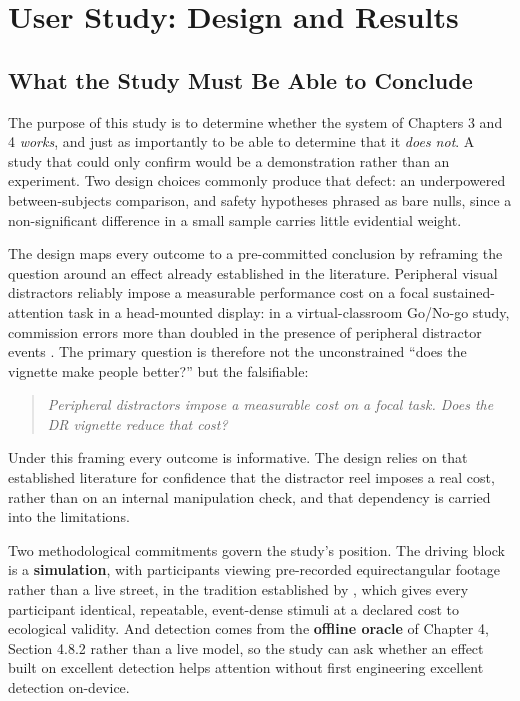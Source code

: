\chapter{User Study: Design and Results}

\section{What the Study Must Be Able to Conclude}

The purpose of this study is to determine whether the system of Chapters 3 and 4 \textit{works},
and just as importantly to be able to determine that it \textit{does not}. A study that could only
confirm would be a demonstration rather than an experiment. Two design choices commonly produce that
defect: an underpowered between-subjects comparison, and safety hypotheses phrased as bare nulls,
since a non-significant difference in a small sample carries little evidential weight.

The design maps every outcome to a pre-committed conclusion by reframing the question around an
effect already established in the literature. Peripheral visual distractors reliably impose a
measurable performance cost on a focal sustained-attention task in a head-mounted display: in a
virtual-classroom Go/No-go study, commission errors more than doubled in the presence of peripheral
distractor events \citep[N = 66]{ai2025}. The primary question is therefore not the unconstrained
``does the vignette make people better?'' but the falsifiable:

\begin{quote}
\textit{Peripheral distractors impose a measurable cost on a focal task. Does the DR vignette reduce
that cost?}
\end{quote}

Under this framing every outcome is informative. The design relies on that established literature for
confidence that the distractor reel imposes a real cost, rather than on an internal manipulation
check, and that dependency is carried into the limitations.

Two methodological commitments govern the study's position. The driving block is a
\textbf{simulation}, with participants viewing pre-recorded equirectangular footage rather than a
live street, in the tradition established by \citet{cheng2022}, which gives every participant
identical, repeatable, event-dense stimuli at a declared cost to ecological validity. And detection
comes from the \textbf{offline oracle} of Chapter 4, Section 4.8.2 rather than a live model, so the
study can ask whether an effect built on excellent detection helps attention without first
engineering excellent detection on-device.


